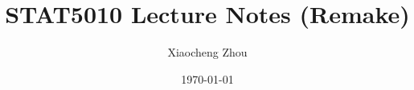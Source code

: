 \documentclass[working]{article}
\title{STAT5010 Lecture Notes (Remake)}
\author{Xiaocheng Zhou}
\date{\today}
\begin{document}
  \createintro

  
  
  
  
  

  \listnotes
  
\end{document}
